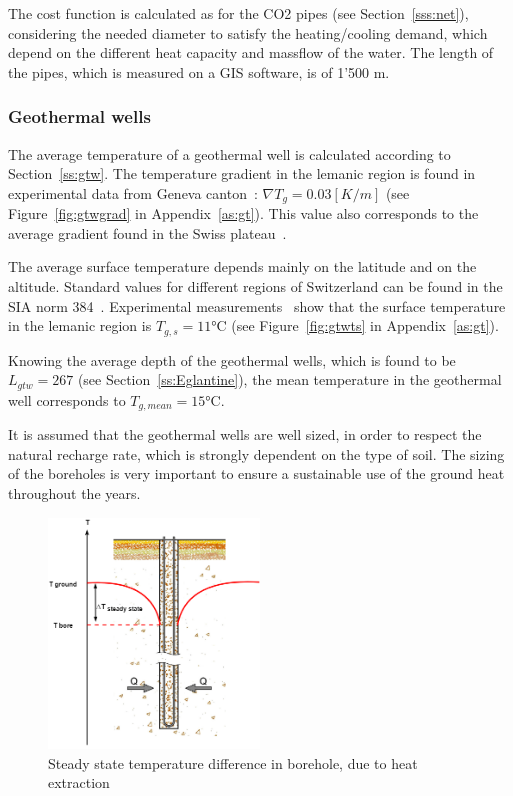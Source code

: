 \documentclass{article}
\begin{document}
The cost function is calculated as for the CO2 pipes (see Section~\ref{sss:net}), considering the needed diameter to satisfy the heating/cooling demand, which depend on the different heat capacity and massflow of the water. The length of the pipes, which is measured on a GIS software, is of 1'500 m.


\subsubsection{Geothermal wells}
The average temperature of a geothermal well is calculated according to Section~\ref{ss:gtw}. The temperature gradient in the lemanic region is found in experimental data from Geneva canton~\cite{gadzEvaluationPotentielGeothermique2011}: $\nabla T_{g} = 0.03 [K/m]$ (see Figure~\ref{fig:gtwgrad} in Appendix~\ref{as:gt}).
This value also corresponds to the average gradient found in the Swiss plateau~\cite{siaSIA384Sondes2010}.

The average surface temperature depends mainly on the latitude and on the altitude. Standard values for different regions of Switzerland can be found in the SIA norm 384~\cite{siaSIA384Sondes2010}. Experimental measurements~\cite{gadzEvaluationPotentielGeothermique2011} show that the surface temperature in the lemanic region is $	T_{g,s} = 11 \si{\celsius}$ (see Figure~\ref{fig:gtwts} in Appendix~\ref{as:gt}).

Knowing the average depth of the geothermal wells, which is found to be $L_{gtw} = 267$ (see Section~\ref{ss:Eglantine}), the mean temperature in the geothermal well corresponds to $T_{g, mean} = 15 \si{\celsius}$.

It is assumed that the geothermal wells are well sized, in order to respect the natural recharge rate, which is strongly dependent on the type of soil. The sizing of the boreholes is very important to ensure a sustainable use of the ground heat throughout the years. \\

\begin{figure}[htp]
	\centering
	\includegraphics[width=0.5\textwidth]{GTW_T_profile.png}
	\caption{Steady state temperature difference in borehole, due to heat extraction}
	\label{fig:GTW_T}
\end{figure}
\end{document}
